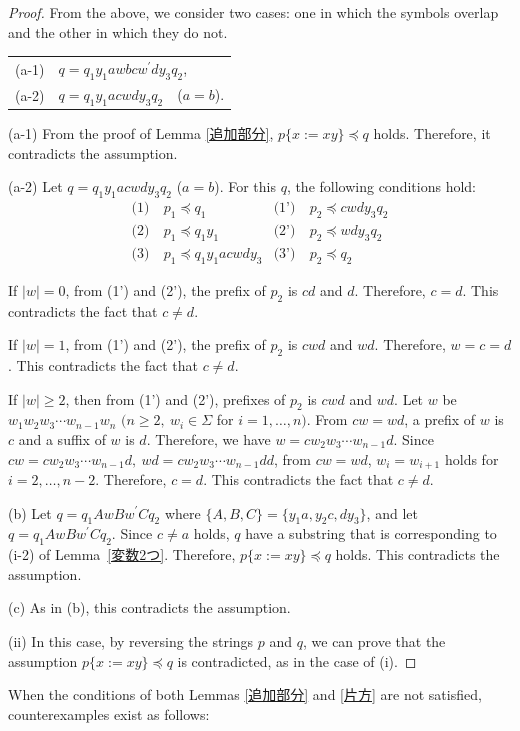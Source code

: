 \begin{proof}
From the above, we consider two cases: one in which the symbols overlap and the other in which they do not.
\smallskip

\begin{tabular}{cl}
\textrm{(a-1)} & $q=q_{1}y_{1}awbcw^{\prime}dy_{3}q_{2}$,\\
\textrm{(a-2)} & $q=q_{1}y_{1}acwdy_{3}q_{2}$~~($a=b$).
\end{tabular}
\smallskip

\textrm{(a-1)}
From the proof of Lemma \ref{追加部分}, $p \{ x:= xy \} \preceq q$ holds.
Therefore, it contradicts the assumption.

\textrm{(a-2)}
Let $q=q_{1}y_{1}acwdy_{3}q_{2}$ ($a=b$).
For this $q$, the following conditions hold:
\begin{align*}
  \textrm{(1)}~& p_{1} \preceq q_{1} & \textrm{(1')}~& p_{2} \preceq cwdy_{3}q_{2} \\
  \textrm{(2)}~& p_{1} \preceq q_{1}y_{1} & \textrm{(2')}~& p_{2} \preceq wdy_{3}q_{2} \\
  \textrm{(3)}~& p_{1} \preceq q_{1}y_{1}acwdy_{3} & \textrm{(3')}~& p_{2} \preceq q_{2}
\end{align*}

%
If $|w|=0$, from (1') and (2'), the prefix of $p_{2}$ is $cd$ and $d$.
Therefore, $c=d$. This contradicts the fact that $c \not = d$.

If $|w|=1$, from (1') and (2'), the prefix of $p_{2}$ is $cwd$ and $wd$.
Therefore, $w=c=d$.
This contradicts the fact that $c \not = d$.

If $|w| \ge 2$, then from (1') and (2'),  prefixes of $p_{2}$ is $cwd$ and $wd$.
Let $w$ be $w_{1}w_{2}w_{3} \cdots w_{n-1}w_{n}$ $(n\geq 2,~w_{i}\in\Sigma$ for $i=1, \ldots , n)$.
From $cw=wd$, a prefix of $w$ is $c$ and a suffix of $w$ is $d$.
Therefore, we have $w=cw_{2}w_{3} \cdots w_{n-1}d$.
Since $cw=cw_{2}w_{3} \cdots w_{n-1}d,~wd=cw_{2}w_{3} \cdots w_{n-1}dd$, from $cw=wd$, $w_{i}=w_{i+1}$ holds for $i=2, \ldots , n-2$.
Therefore, $c=d$. This contradicts the fact that $c \not = d$.

\textrm{(b)}
Let $q=q_{1}AwBw^{\prime}Cq_{2}$ where $\{ A,B,C \} = \{ y_{1}a,y_{2}c,dy_{3} \}$, and let $q=q_{1}AwBw^{\prime}Cq_{2}$.
Since $c \not = a$ holds, $q$ have a substring that is corresponding to (i-2) of Lemma~\ref{変数2つ}.
Therefore, $p \{ x:= xy \} \preceq q$ holds.
This contradicts the assumption. 

\textrm{(c)} As in (b), this contradicts the assumption.

\noindent\textrm{(ii)}
In this case, by reversing the strings $p$ and $q$, we can prove that the assumption $p \{ x := xy \} \preceq q$ is contradicted, as in the case of \textrm{(i)}.
\end{proof}
When the conditions of both Lemmas \ref{追加部分} and \ref{片方} are not satisfied, counterexamples exist as follows:

